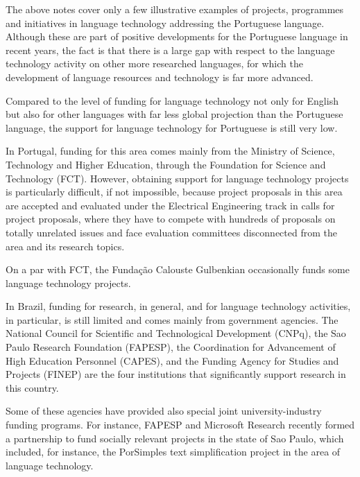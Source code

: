 \begin{multicols}{2}
The above notes cover only a few illustrative examples of projects, programmes and initiatives in language technology addressing the Portuguese language. Although these are part of positive developments for the Portuguese language in recent years, the fact is that there is a large gap with respect to the language technology activity on other more researched languages, for which the development of language resources and technology is far more advanced. 

Compared to the level of funding for language technology not only for English but also for other languages
with far less global projection than the Portuguese language, 
the support for language technology for Portuguese is still very low. 

In Portugal, funding for this area comes mainly from the Ministry of Science, Technology and Higher Education, through the Foundation for Science and Technology (FCT). However, obtaining support for language technology projects is particularly difficult, if not impossible, 
because project proposals in this area are accepted and evaluated under the Electrical Engineering track in calls for project proposals, 
where they have to compete with hundreds of proposals on totally unrelated issues and face evaluation committees
disconnected from the area and its research topics. 

On a par with FCT, the Fundação Calouste Gulbenkian occasionally funds some language technology projects.


In Brazil, funding for research, in general, and for language technology activities, in particular, is still limited and comes mainly from government agencies. 
The National Council for Scientific and Technological Development (CNPq), 
the Sao Paulo Research Foundation (FAPESP), 
the Coordination for Advancement of High Education Personnel (CAPES), 
and the Funding Agency for Studies and Projects (FINEP) are the four institutions that significantly 
support research in this country. 

Some of these agencies have provided also special joint university-industry funding programs. For instance, FAPESP and Microsoft Research recently formed a partnership to fund socially relevant projects in the state of Sao Paulo, which included, for instance, the PorSimples \cite{porsimples} text simplification project in the area of language technology. 



\end{multicols}
